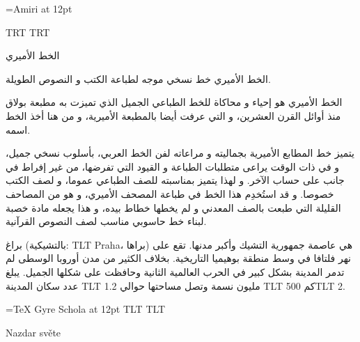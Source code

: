 \documentclass{article}
\newcommand\textlatin[1]{\bgroup\luatextextdir TLT #1\egroup}
\begin{document}
\font\amiri={Amiri} at 12pt
\amiri
\startharfbuzz


\luatextextdir TRT
\luatexpardir TRT

الخط الأميري 

الخط الأميري خط نسخي موجه لطباعة الكتب و النصوص الطويلة.

الخط الأميري هو إحياء و محاكاة للخط الطباعي الجميل الذي تميزت به مطبعة بولاق منذ أوائل القرن العشرين، و التي عرفت أيضا بالمطبعة الأميرية، و من هنا أخذ الخط اسمه.

يتميز خط المطابع الأميرية بجماليته و مراعاته لفن الخط العربي، بأسلوب نسخي جميل، و في ذات الوقت يراعى متطلبات الطباعة و القيود التي تفرضها، من غير إفراط في جانب على حساب الآخر. و لهذا يتميز بمناسبته للصف الطباعي عموما، و لصف الكتب خصوصا. و قد استُخدِم هذا الخط في طباعة المصحف الأميري، و هو من المصاحف القليلة التي طبعت بالصف المعدني و لم يخطها خطاط بيده، و هذا يجعله مادة خصبة لبناء خط حاسوبي مناسب لصف النصوص القرآنية.

براغ (بالتشيكية: \textlatin{Praha}، براها) هي عاصمة جمهورية التشيك وأكبر مدنها. تقع على نهر فلتافا في وسط منطقة بوهيميا التاريخية. بخلاف الكثير من مدن أوروبا الوسطى لم تدمر المدينة بشكل كبير في الحرب العالمية الثانية وحافظت على شكلها الجميل. يبلغ عدد سكان المدينة \textlatin{1.2} مليون نسمة وتصل مساحتها حوالي \textlatin{500} كم\textlatin{2.}

\font\tgschola={TeX Gyre Schola} at 12pt
\tgschola
\luatextextdir TLT
\luatexpardir TLT

Nazdar světe
\end{document}
